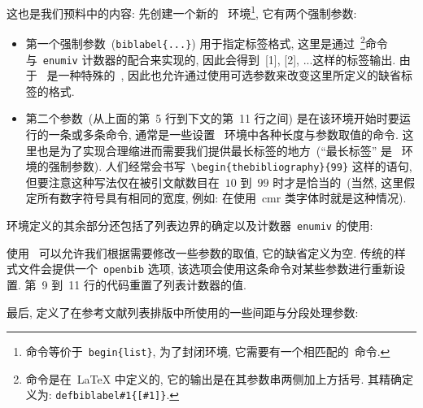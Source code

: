 \documentclass{article}
\begin{document}
\begin{listingcont}
      \list{\@biblabel{\@arabic\c@enumiv}}%
           {\settowidth{}%
\end{listingcont}
这也是我们预料中的内容: 先创建一个新的~ 环境\footnote{ 命令等价于~\texttt{\bs begin\{list\}}, 为了封闭环境, 它需要有一个相匹配的~命令.}, 它有两个强制参数: 
\begin{itemize}
\item 第一个强制参数~(\texttt{\bs\at biblabel\{...\}}) 用于指定标签格式, 这里是通过~\footnote{ 命令是在~\LaTeX{} 中定义的, 它的输出是在其参数串两侧加上方括号. 其精确定义为:
\texttt{\bs def\bs\at biblabel\#1\{[\#1]\}}.}命令与~\verb+enumiv+ 计数器的配合来实现的, 因此会得到~[1], [2], ...这样的标签输出. 由于~ 是一种特殊的~, 因此也允许通过使用可选参数来改变这里所定义的缺省标签的格式. 
\item 第二个参数~(从上面的第~5 行到下文的第~11 行之间) 是在该环境开始时要运行的一条或多条命令, 通常是一些设置~ 环境中各种长度与参数取值的命令. 这里也是为了实现合理缩进而需要我们提供最长标签的地方~(``最长标签'' 是~ 环境的强制参数). 人们经常会书写~\verb+\begin{thebibliography}{99}+ 这样的语句, 但要注意这种写法仅在被引文献数目在~\(10\) 到~\(99\) 时才是恰当的~(当然, 这里假定所有数字符号具有相同的宽度, 例如: 在使用~\textsf{cmr} 类字体时就是这种情况). 
\end{itemize}


 环境定义的其余部分还包括了列表边界的确定以及计数器~\verb+enumiv+ 的使用:
\begin{listingcont}
            \leftmargin{}
            \advance\leftmargin{}
            \@openbib@code
            \let\p@enumiv\@empty
            \renewcommand\theenumiv{\@arabic\c@enumiv}}%
\end{listingcont}
使用~ 可以允许我们根据需要修改一些参数的取值, 它的缺省定义为空. 传统的样式文件会提供一个~\texttt{openbib} 选项, 该选项会使用这条命令对某些参数进行重新设置. 第~9 到~11 行的代码重置了列表计数器的值.

最后, 定义了在参考文献列表排版中所使用的一些间距与分段处理参数: 
\begin{listingcont}
      \sloppy
      \@clubpenalty \clubpenalty
      \sfcode`\.\@m}
\end{listingcont}
\end{document}
